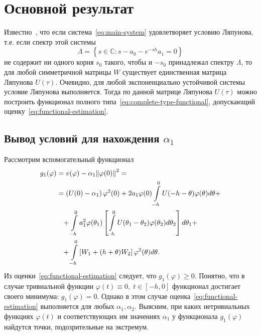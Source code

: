 \documentclass[a4paper,14pt]{article}
\theoremstyle{definition}
\begin{document}
\section{Основной результат}

Известно~\cite[стр.~51]{kharitonov2013}, что если система~\eqref{eq:main-system}
удовлетворяет условию Ляпунова, т.е. если спектр этой системы
\begin{equation*}
  \Lambda = \left\{ s \in \mathbb{C}: s - a_0 - e^{-sh} a_1 = 0 \right\}
\end{equation*}
не содержит ни одного корня $s_0$ такого, чтобы и $-s_0$ принадлежал спектру
$\Lambda$, то для любой симметричной матрицы $W$ существует единственная матрица
Ляпунова $U(\tau)$. Очевидно, для любой экспоненциально устойчивой системы
условие Ляпунова выполняется. Тогда по данной матрице Ляпунова $U(\tau)$
можно построить функционал полного типа~\eqref{eq:complete-type-functional},
допускающий оценку~\eqref{eq:functional-estimation}.

\subsection{Вывод условий для нахождения $\alpha_1$}

Рассмотрим вспомогательный функционал
\begin{equation*}
  \begin{aligned}
    g_1(\varphi)
    &=
      v(\varphi) - \alpha_1 \norm{\varphi(0)}^2 = \\
    &=
      \left( U(0) - \alpha_1 \right) \varphi^2(0)
      +
      2 a_1 \varphi(0) \int\limits_{-h}^{0} U(-h - \theta) \varphi(\theta) d\theta
      + \\
    &\phantom{=}
      +
      \int\limits_{-h}^{0} a_1^2 \varphi(\theta_1) \left[
      \int\limits_{-h}^{0} U(\theta_1 - \theta_2) \varphi(\theta_2) d\theta_2
      \right] d\theta_1
      + \\
    &\phantom{=}
      +
      \int\limits_{-h}^{0} \left[
      W_1 + (h + \theta) W_2
      \right] \varphi^2(\theta) d\theta.
  \end{aligned}
\end{equation*}
Из оценки~\eqref{eq:functional-estimation} следует, что $g_1(\varphi) \geqslant 0$.
Понятно, что в случае тривиальной функции $\varphi(t) \equiv 0, \; t \in [-h, 0]$
функционал достигает своего минимума: $g_1(\varphi) = 0$. Однако в этом случае
оценка~\eqref{eq:functional-estimation} выполняется для любых $\alpha_1, \alpha_2$.
Выясним, при каких нетривиальных функциях $\varphi(t)$ и соответствующих им значениях
$\alpha_1$ у функционала $g_1(\varphi)$ найдутся точки, подозрительные на экстремум.
\end{document}
